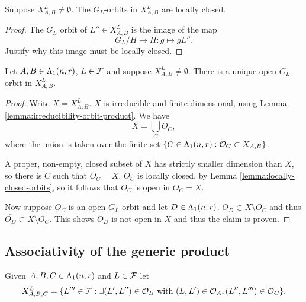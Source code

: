 \documentclass[a4paper, 11pt]{report}
\begin{document}
\begin{proposition}\label{lemma:locally-closed-orbits}
Suppose $X_{A,B}^L\neq\emptyset$. The $G_L$-orbits in $X_{A,B}^L$ are locally closed.
\end{proposition}
\begin{proof}
The $G_L$ orbit of $L''\in X_{A,B}^L$ is the image of the map
\begin{equation*}
G_L/H\to\Pi: g\mapsto g L''.
\end{equation*}
{\color{red} Justify why this image must be locally closed.}
\end{proof}

\begin{proposition}
Let $A,B\in\Lambda_1(n,r)$, $L\in\mathcal{F}$ and suppose $X_{A,B}^L\neq\emptyset$. There is a unique open $G_L$-orbit in $X_{A,B}^L$.
\end{proposition}

\begin{proof}{\color{gray}
Write $X=X_{A,B}^L$. $X$ is irreducible and finite dimensional, using Lemma  \ref{lemma:irreducibility-orbit-product}. We have
\begin{equation*}
X = \bigcup_C O_C,
\end{equation*}
where the union is taken over the finite set $\{C\in\Lambda_1(n,r) : \mathcal{O}_C\subset X_{A,B}\}$.

A proper, non-empty, closed subset of $X$ has strictly smaller dimension than $X$, so there is $C$ such that $\overline{O_C}=X$. $O_C$ is locally closed, by Lemma \ref{lemma:locally-closed-orbits}, so it follows that $O_C$ is open in $\overline{O_C}=X$.

Now suppose $O_C$ is an open $G_L$ orbit and let $D\in\Lambda_1(n,r)$. $O_D\subset X\setminus O_C$ and thus $\overline{O_D}\subset X\setminus O_C$. This shows $O_D$ is not open in $X$ and thus the claim is proven.}
\end{proof}

\subsection{Associativity of the generic product}

Given $A,B,C\in\Lambda_1(n,r)$ and $L\in\mathcal{F}$ let
\begin{equation*}
X_{A,B,C}^L = \{L'''\in \mathcal{F}:\exists (L',L'')\in\mathcal{O}_B \text{ with } (L,L')\in\mathcal{O}_A, (L'',L''')\in\mathcal{O}_C\}.
\end{equation*}
\end{document}
